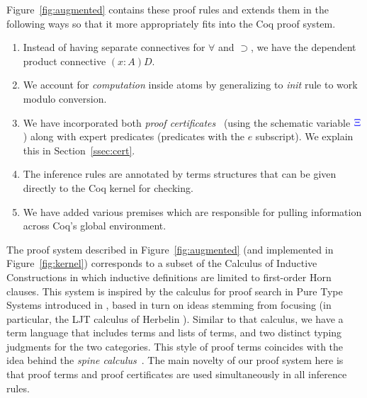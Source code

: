 Figure~\ref{fig:augmented} contains these proof rules and extends them
in the following ways so that it more appropriately fits into
the Coq proof system.
\begin{enumerate}
  \item Instead of having separate connectives for $\forall$ and
    $\supset$, we have the dependent product connective $(x:A)D$. 
  \item We account for \emph{computation} inside atoms by generalizing
    to \emph{init} rule to work modulo conversion.
  \item We have incorporated both \emph{proof certificates}~\cite{chihani17jar} (using the
    schematic variable ${\color{blue}{\Xi}}$) along with expert predicates
    (predicates with the $e$ subscript). We explain this in Section~\ref{ssec:cert}.
  \item The inference rules are  annotated by terms structures that
    can be given directly to the Coq kernel for checking.
  \item We have added various premises which are responsible for
    pulling information across  Coq's global environment.
\end{enumerate}
The proof system described in Figure~\ref{fig:augmented} (and
implemented in Figure~\ref{fig:kernel}) corresponds to a subset of the Calculus
of Inductive Constructions in which inductive definitions are
limited to first-order Horn clauses.
%
This  system is inspired by the calculus for proof search in
Pure Type Systems introduced in \cite{LengrandDM06}, based in turn on
ideas stemming from focusing (in particular, the LJT calculus of
Herbelin \cite{Herbelin94}). Similar to that calculus, we have a
term language that includes terms and lists of terms, and two distinct
typing judgments for the two categories.
%
This style of  proof terms coincides with the idea behind the \emph{spine
  calculus}~\cite{Cervesato97tr}.  The main novelty of our proof
system here is that proof terms and proof certificates are used
simultaneously in all inference rules.

